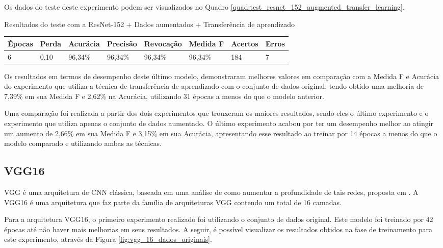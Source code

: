 \documentclass[
	12pt,				%
	oneside,			%
	a4paper,			%
	english,			%
	brazil				%
	]{abntex2ppgsi}
\begin{document}
Os dados do teste deste experimento podem ser visualizados no Quadro \ref{quad:test_resnet_152_augmented_transfer_learning}.

\begin{quadro}[H]
\caption{Resultados do teste com a ResNet-152 + Dados aumentados + Transferência de aprendizado}
\label{quad:test_resnet_152_augmented_transfer_learning}
\centering
\begin{tabular}{|l|l|l|l|l|l|l|l|}
\cline{1-8}
Épocas & Perda & Acurácia & Precisão & Revocação & Medida F & Acertos & Erros \\ \hline
6 & 0,10 & 96,34\% & 96,34\% & 96,34\% & 96,34\% & 184 & 7 \\
\cline{1-8}
\end{tabular}
\end{quadro}

Os resultados em termos de desempenho deste último modelo, demonstraram melhores valores em comparação com a Medida F e Acurácia do experimento que utiliza a técnica de transferência de aprendizado com o conjunto de dados original, tendo obtido uma melhoria de 7,39\% em sua Medida F e 2,62\% na Acurácia, utilizando 31 épocas a menos do que o modelo anterior. 

Uma comparação foi realizada a partir dos dois experimentos que trouxeram os maiores resultados, sendo eles o último experimento e o experimento que utiliza apenas o conjunto de dados aumentado. O último experimento acabou por ter um desempenho melhor ao atingir um aumento de 2,66\% em sua Medida F e 3,15\% em sua Acurácia, apresentando esse resultado ao treinar por 14 épocas a menos do que o modelo comparado e utilizando ambas as técnicas.

\subsection{VGG16}
VGG é uma arquitetura de CNN clássica, baseada em uma análise de como aumentar a profundidade de tais redes, proposta em . A VGG16 é uma arquitetura que faz parte da família de arquiteturas VGG contendo um total de 16 camadas.

Para a arquitetura VGG16, o primeiro experimento realizado foi utilizando o conjunto de dados original. Este modelo foi treinado por 42 épocas até não haver mais melhorias em seus resultados. A seguir, é possível visualizar os resultados obtidos na fase de treinamento para este experimento, através da Figura \ref{fig:vgg_16_dados_originais}.
\end{document}
